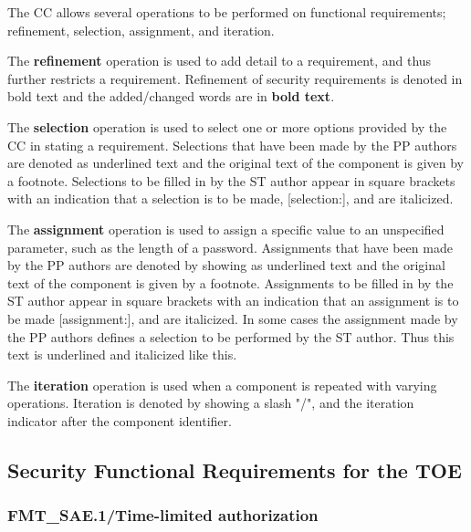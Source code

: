 \documentclass[10pt,titlepage]{article}
\begin{document}
The CC allows several operations to be performed on functional requirements; refinement,
selection, assignment, and iteration.

The \textbf{refinement} operation is used to add detail to a requirement, and thus further restricts a requirement. Refinement of security requirements is denoted in bold text and the added/changed words are in \textbf{bold text}.


The \textbf{selection} operation is used to select one or more options provided by the CC in stating a requirement. Selections that have been made by the PP authors are denoted as underlined text and the original text of the component is given by a footnote. Selections to be filled in by the ST author appear in square brackets with an indication that a selection is to be made, [selection:], and are italicized.


The \textbf{assignment} operation is used to assign a specific value to an unspecified parameter, such as the length of a password. Assignments that have been made by the PP authors are denoted by showing as underlined text and the original text of the component is given by a footnote. Assignments to be filled in by the ST author appear in square brackets with an indication that an assignment is to be made [assignment:], and are italicized. In some cases the assignment made by the PP authors defines a selection to be performed by the ST author. Thus this text is underlined and italicized like this.

The \textbf{iteration} operation is used when a component is repeated with varying operations. Iteration is denoted by showing a slash "\//", and the iteration indicator after the component identifier.

\subsection{Security Functional Requirements for the TOE}


\subsubsection{FMT\_SAE.1/Time-limited authorization}
\end{document}
